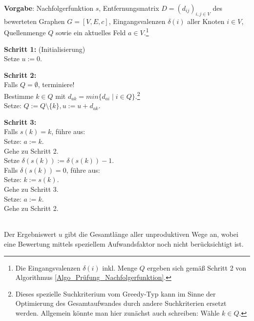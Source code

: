 \begin{algo}\label{Algo_unproduktive_Wege}
\textbf{Vorgabe}: Nachfolgerfunktion $s$, Entfernungsmatrix $D = (d_{ij})_{i,j \in V}$ des bewerteten Graphen $G=[V,E,c]$, Eingangsvalenzen $\delta(i)$ aller Knoten $i \in V$, Quellenmenge $Q$ sowie ein aktuelles Feld $a \in V$.\footnote{Die Eingangsvalenzen $\delta(i)$ inkl. Menge $Q$ ergeben sich gemäß Schritt 2 von Algorithmus \ref{Algo_Prüfung_Nachfolgerfunktion}.}

\noindent 
\textbf{Schritt 1:} (Initialisierung)\\
\phantom \quad Setze $u := 0$.

\noindent 
\textbf{Schritt 2:}\\
\phantom \quad Falls $Q = \emptyset$, terminiere! \\
\phantom \quad Bestimme $k \in Q$ mit $d_{ak} = min\{d_{ai} \mid i \in Q\}$.\footnote{Dieses spezielle Suchkriterium vom Greedy-Typ kann im Sinne der Optimierung des Gesamtaufwandes durch andere Suchkriterien ersetzt werden. Allgemein könnte man hier zunächst auch schreiben: Wähle $k \in Q$.} \\
\phantom \quad Setze: $Q := Q\setminus \{k\}, u := u + d_{ak}$.

\noindent 
\textbf{Schritt 3:}\\
\phantom \quad Falls $s(k)= k$, führe aus:\\
\phantom \quad \qquad Setze: $a := k$.\\
\phantom \quad \qquad Gehe zu Schritt 2.\\
\phantom \quad Setze $\delta(s(k)) := \delta(s(k))-1$.\\
\phantom \quad Falls $\delta(s(k)) = 0$, führe aus:\\
\phantom \quad \qquad Setze: $k := s(k)$.\\
\phantom \quad \qquad Gehe zu Schritt 3.\\
\phantom \quad Setze: $a := k$.\\
\phantom \quad Gehe zu Schritt 2.
\end{algo}

\phantom \\
\noindent Der Ergebniswert $u$ gibt die Gesamtlänge aller unproduktiven Wege an, wobei eine Bewertung mittels speziellem Aufwandsfaktor noch nicht berücksichtigt ist.\\

